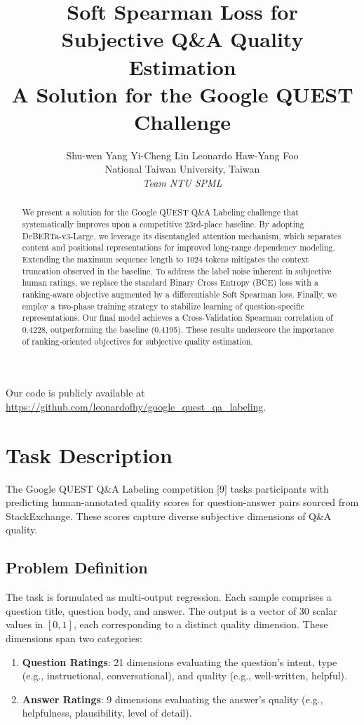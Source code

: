 \documentclass{article}
\title{Soft Spearman Loss for \\ Subjective Q\&A Quality Estimation \\ 
\vspace{2mm} \large A Solution for the Google QUEST Challenge}
\author{%
  Shu-wen Yang \quad Yi-Cheng Lin \quad Leonardo Haw-Yang Foo \\
  National Taiwan University, Taiwan \\
  \textit{Team NTU SPML}
}
\begin{document}
\maketitle


\begin{abstract}
  We present a solution for the Google QUEST Q\&A Labeling challenge that systematically improves upon a competitive 23rd-place baseline. By adopting DeBERTa-v3-Large, we leverage its disentangled attention mechanism, which separates content and positional representations for improved long-range dependency modeling. Extending the maximum sequence length to 1024 tokens mitigates the context truncation observed in the baseline. To address the label noise inherent in subjective human ratings, we replace the standard Binary Cross Entropy (BCE) loss with a ranking-aware objective augmented by a differentiable Soft Spearman loss. Finally, we employ a two-phase training strategy to stabilize learning of question-specific representations. Our final model achieves a Cross-Validation Spearman correlation of 0.4228, outperforming the baseline (0.4195). These results underscore the importance of ranking-oriented objectives for subjective quality estimation.
\end{abstract}

\noindent Our code is publicly available at \url{https://github.com/leonardofhy/google_quest_qa_labeling}.


\section{Task Description}

The Google QUEST Q\&A Labeling competition [9] tasks participants with predicting human-annotated quality scores for question-answer pairs sourced from StackExchange. These scores capture diverse subjective dimensions of Q\&A quality.

\subsection{Problem Definition}
The task is formulated as multi-output regression. Each sample comprises a question title, question body, and answer. The output is a vector of 30 scalar values in $[0, 1]$, each corresponding to a distinct quality dimension. These dimensions span two categories:
\begin{enumerate}
    \item \textbf{Question Ratings}: 21 dimensions evaluating the question's intent, type (e.g., instructional, conversational), and quality (e.g., well-written, helpful).
    \item \textbf{Answer Ratings}: 9 dimensions evaluating the answer's quality (e.g., helpfulness, plausibility, level of detail).
\end{enumerate}
\end{document}
